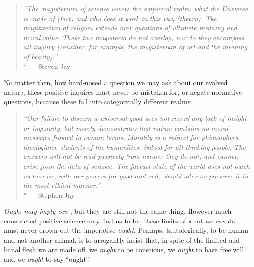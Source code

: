 \begin{quote}
	\emph{``The magisterium of science covers the empirical realm:
	what the Universe is made of (fact) and why does it work in this way (theory).
	The magisterium of religion extends over questions of ultimate meaning and moral value.
	These two magisteria do not overlap, nor do they encompass all inquiry (consider, for example, the magisterium of art and the meaning of beauty).''}
	\\*
	--- Steven Jay \citet[6]{Gould2002}
\end{quote}

No matter then, how hard-nosed a question we may ask about our evolved nature, these positive inquires must never be mistaken for, or negate normative questions, because these fall into categorically different realms:

\begin{quote}
	\emph{``Our failure to discern a universal good does not record any lack of insight or ingenuity, but merely demonstrates that nature contains no moral messages framed in human terms.
	Morality is a subject for philosophers, theologians, students of the humanities, indeed for all thinking people.
	The answers will not be read passively from nature:
	they do not, and cannot, arise from the data of science.
	The factual state of the world does not teach us how we, with our powers for good and evil, should alter or preserve it in the most ethical manner.''}
	\\*
	--- Stephen Jay \citet[43]{Gould1982}
\end{quote}

\emph{Ought may imply can} \citep[65]{Kant1794}, but they are still not the same thing.
However much constricted positive science may find us to be, these limits of what we \emph{can} do must never drown out the imperative \emph{ought}.
Perhaps, tautologically, to be human and not another animal, is to arrogantly insist that, in spite of the limited and banal flesh we are made off, we \emph{ought} to be conscious, we \emph{ought} to have free will and we \emph{ought} to say ``ought''.

